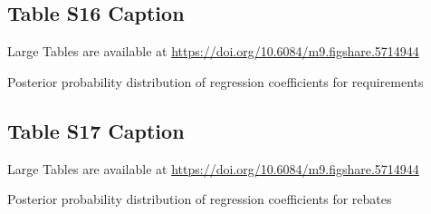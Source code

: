 \documentclass[draft]{agujournal}\usepackage{knitr}
\begin{document}
\subsection*{Table S16 Caption}
\setcounter{table}{15}%
\begin{table}[H]
\centering
Large Tables are available at \url{https://doi.org/10.6084/m9.figshare.5714944}
\caption{Posterior probability distribution of regression coefficients for requirements}
\end{table}


\subsection*{Table S17 Caption}
\setcounter{table}{16}%
\begin{table}[H]
\centering
Large Tables are available at \url{https://doi.org/10.6084/m9.figshare.5714944}
\caption{Posterior probability distribution of regression coefficients for rebates}
\end{table}
\end{document}
